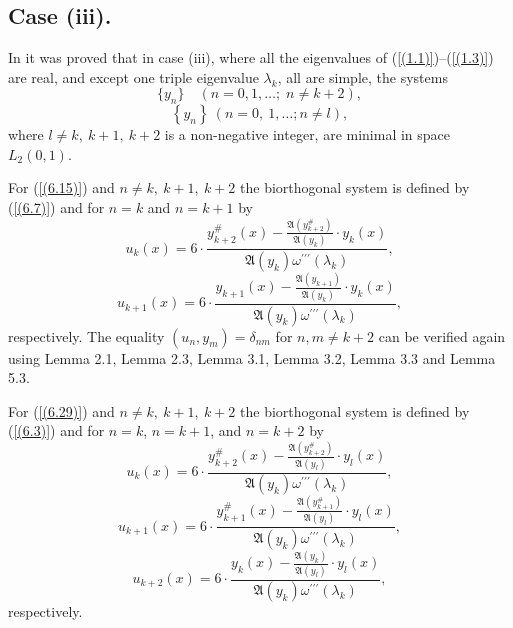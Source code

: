 \documentclass[pdflatex,sn-mathphys-num]{sn-jnl}%
\theoremstyle{thmstyleone}%
\theoremstyle{thmstyletwo}%
\theoremstyle{thmstylethree}%
\theoremstyle{definition}
\theoremstyle{remark}
\numberwithin{equation}{section}
\begin{document}
\subsection{Case (iii).}

In \cite{aliyev5} it was proved that in case (iii), where  all the eigenvalues of (\ref{(1.1)})--(\ref{(1.3)}) are real, and except one triple eigenvalue $\lambda_k$, all are simple, the systems
\begin{equation}
  \{ y_n \} \quad (n = 0,1,\ldots;\; n \neq k+2), \label{(6.15)} 
\end{equation}
\begin{equation}
  \left\{ y_{n}\right\}  \ (n=0,\ 1,\ldots ; n \ne l),\label{(6.29)}  
\end{equation}
where $l \ne k,\ k+1,\ k+2$ is a non-negative integer,
are minimal in space $L_2(0,1)$.



For (\ref{(6.15)}) and $n \ne k,\ k+1,\ k+2$ the biorthogonal system is defined by (\ref{(6.7)}) and for 
$n = k$ and $n = k+1$ by
\begin{equation}
u_k(x)=6\cdot\frac{y^{\#}_{k+2}(x)-\frac{\mathfrak{A}(y^{\#}_{k+2})}{\mathfrak{A}(y_k)}\cdot y_k(x)}{ \mathfrak{A}(y_k)\omega^{\prime\prime\prime}(\lambda_k)}
, \label{(6.16)}
\end{equation}
\begin{equation}
u_{k+1}(x)=6\cdot\frac{y_{k+1}(x)-\frac{\mathfrak{A}(y_{k+1})}{\mathfrak{A}(y_k)}\cdot y_k(x)}{ \mathfrak{A}(y_{k})\omega^{\prime\prime\prime}(\lambda_k)}
, \label{(6.17)}
\end{equation}
respectively. The equality $(u_n, y_m) = \delta_{nm}$ for $ n,m\neq k+2$ can be verified again using Lemma 2.1, Lemma 2.3, Lemma 3.1, Lemma 3.2, Lemma 3.3 and Lemma 5.3.

For (\ref{(6.29)}) and $n \ne k,\ k+1,\ k+2$ the biorthogonal system is defined by (\ref{(6.3)}) and for 
$n = k$, $n = k+1$, and $n = k+2$ by
\begin{equation}
u_k(x)=6\cdot\frac{y^{\#}_{k+2}(x)-\frac{\mathfrak{A}(y^{\#}_{k+2})}{\mathfrak{A}(y_l)}\cdot y_l(x)}{ \mathfrak{A}(y_k)\omega^{\prime\prime\prime}(\lambda_k)}
, \label{(6.30)}
\end{equation}
\begin{equation}
u_{k+1}(x)=6\cdot\frac{y^{\#}_{k+1}(x)-\frac{\mathfrak{A}(y^{\#}_{k+1})}{\mathfrak{A}(y_l)}\cdot y_l(x)}{ \mathfrak{A}(y_k)\omega^{\prime\prime\prime}(\lambda_k)}
, \label{(6.31)}
\end{equation}
\begin{equation}
u_{k+2}(x)=6\cdot\frac{y_{k}(x)-\frac{\mathfrak{A}(y_{k})}{\mathfrak{A}(y_l)}\cdot y_l(x)}{ \mathfrak{A}(y_k)\omega^{\prime\prime\prime}(\lambda_k)}
, \label{(6.32)}
\end{equation}
respectively.
\end{document}
